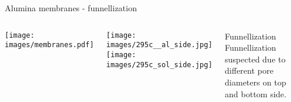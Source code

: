 \documentclass[../defence.tex]{subfiles}
\begin{document}
  \begin{frame}{Alumina membranes - funnellization}
    \begin{columns}[onlytextwidth, T]

        \texttt{[image: images/membranes.pdf]}
        \pause

        \begin{columns}[onlytextwidth, T]
            \texttt{[image: images/295c\_\_al\_side.jpg]}
            \texttt{[image: images/295c\_sol\_side.jpg]}
        \end{columns}
        \pause

        \begin{block}{Funnellization}
          Funnellization suspected due to different pore diameters on top\\ and bottom side.
        \end{block}
    \end{columns}
  \end{frame}
\end{document}
